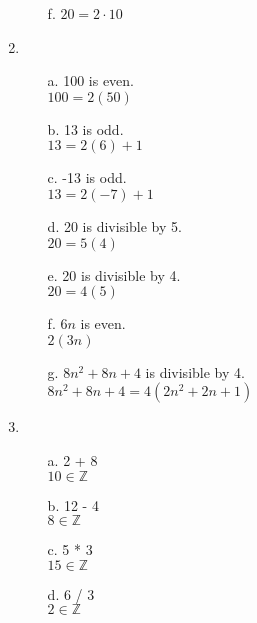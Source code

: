 \begin{enumerate}
\begin{itemize}
                \item[f.] $20 = 2 \cdot 10$
            \end{itemize}

        \item
            \begin{enumerate}
                \item[a.] 100 is even. \\
                    $100 = 2(50)$

                \item[b.] 13 is odd. \\
                    $13 = 2(6) + 1$

                \item[c.] -13 is odd. \\
                    $13 = 2(-7) + 1$

                \item[d.] 20 is divisible by 5. \\
                    $20 = 5(4)$

                \item[e.] 20 is divisible by 4. \\
                    $20 = 4(5)$

                \item[f.] $6n$ is even. \\ 
                    $2(3n)$

                \item[g.] $8n^{2} + 8n + 4$ is divisible by 4. \\
                    $8n^{2} + 8n + 4 = 4(2n^{2} + 2n + 1)$
            \end{enumerate}

        \item
            \begin{enumerate}
                \item[a.] 2 + 8 \\ $10 \in \mathbb{Z}$ 

                \item[b.] 12 - 4 \\ $8 \in \mathbb{Z}$

                \item[c.] 5 * 3 \\ $15 \in \mathbb{Z}$ 

                \item[d.] 6 / 3 \\ $2 \in \mathbb{Z}$ 


\end{enumerate}
\end{enumerate}
